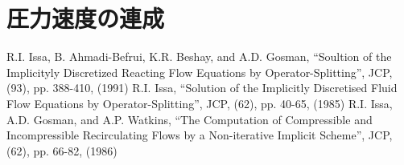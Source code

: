 \documentclass[a4paper,10pt,fleqn]{jsarticle}
\begin{document}
\section{圧力速度の連成}


\begin{thebibliography}{99}
 R.I. Issa, B. Ahmadi-Befrui, K.R. Beshay, and
        A.D. Gosman, ``Soultion of the Implicityly Discretized Reacting
        Flow Equations by Operator-Splitting'', JCP, (93), pp. 388-410, (1991)
 R.I. Issa, ``Solution of the Implicitly Discretised
        Fluid Flow Equations by Operator-Splitting'', JCP, (62),
        pp. 40-65, (1985)
 R.I. Issa, A.D. Gosman, and A.P. Watkins, ``The
        Computation of Compressible and Incompressible Recirculating
        Flows by a Non-iterative Implicit Scheme'', JCP, (62),
        pp. 66-82, (1986)
\end{thebibliography}
\end{document}
